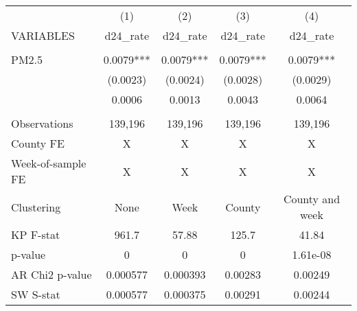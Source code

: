 \begin{tabular}{lcccc} \hline
 & (1) & (2) & (3) & (4) \\
VARIABLES & d24\_rate & d24\_rate & d24\_rate & d24\_rate \\ \hline
 &  &  &  &  \\
PM2.5 & 0.0079*** & 0.0079*** & 0.0079*** & 0.0079*** \\
 & (0.0023) & (0.0024) & (0.0028) & (0.0029) \\
 & 0.0006 & 0.0013 & 0.0043 & 0.0064 \\
 &  &  &  &  \\
Observations & 139,196 & 139,196 & 139,196 & 139,196 \\
County FE & X & X & X & X \\
Week-of-sample FE & X & X & X & X \\
Clustering & None & Week & County & County and week \\
KP F-stat & 961.7 & 57.88 & 125.7 & 41.84 \\
p-value & 0 & 0 & 0 & 1.61e-08 \\
AR Chi2 p-value & 0.000577 & 0.000393 & 0.00283 & 0.00249 \\
 SW S-stat & 0.000577 & 0.000375 & 0.00291 & 0.00244 \\ \hline
\end{tabular}
